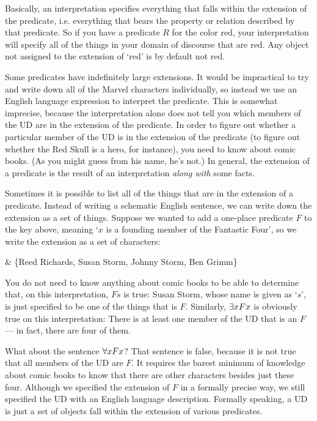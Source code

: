 
{\color{black} Basically, an interpretation specifies everything that falls within the extension of the predicate, i.e. everything that bears the property or relation described by that predicate. So if you have a predicate $R$ for the color red, your interpretation will specify all of the things in your domain of discourse that are red. Any object not assigned to the extension of `red' is by default not red.}

Some predicates have indefinitely large extensions. It would be impractical to try and write down all of the Marvel characters individually, so instead we use an English language expression to interpret the predicate. This is somewhat imprecise, because the interpretation alone does not tell you which members of the UD are in the extension of the predicate. In order to figure out whether a particular member of the UD is in the extension of the predicate (to figure out whether the Red Skull is a hero, for instance), you need to know about comic books. (As you might guess from his name, he's not.) In general, the extension of a predicate is the result of an interpretation \emph{along with} some facts.

Sometimes it is possible to list all of the things that are in the extension of a predicate. Instead of writing a schematic English sentence, we can write down the extension as a set of things. Suppose we wanted to add a one-place predicate $F$ to the key above, meaning `$x$ is a founding member of the Fantastic Four', so we write the extension as a set of characters:
\begin{partialmodel}
	 & \{Reed Richards, Susan Storm, Johnny Storm, Ben Grimm\}
\end{partialmodel}

You do not need to know anything about comic books to be able to determine that, on this interpretation, $Fs$ is true: Susan Storm, whose name is given as `$s$', is just specified to be one of the things that is $F$. Similarly, $\exists x Fx$ is obviously true on this interpretation: There is at least one member of the UD that is an $F$ --- in fact, there are four of them.

What about the sentence $\forall x Fx$? That sentence is false, because it is not true that all members of the UD are $F$. It requires the barest minimum of knowledge about comic books to know that there are other characters besides just these four. Although we specified the extension of $F$ in a formally precise way, we still specified the UD with an English language description. Formally speaking, a UD is just a set of {\color{black}objects fall within the extension of various predicates.}

